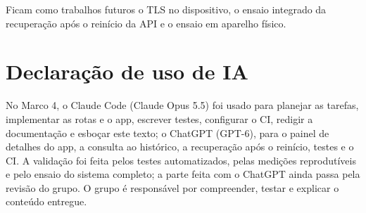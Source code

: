 \documentclass[12pt,a4paper]{article}
\begin{document}
Ficam como trabalhos futuros o TLS no dispositivo, o ensaio integrado da recuperação após o reinício da API e o ensaio em aparelho físico.

\section*{Declaração de uso de IA}
No Marco 4, o Claude Code (Claude Opus 5.5) foi usado para planejar as tarefas, implementar as rotas e o app, escrever testes, configurar o CI, redigir a documentação e esboçar este texto; o ChatGPT (GPT-6), para o painel de detalhes do app, a consulta ao histórico, a recuperação após o reinício, testes e o CI.
A validação foi feita pelos testes automatizados, pelas medições reprodutíveis e pelo ensaio do sistema completo; a parte feita com o ChatGPT ainda passa pela revisão do grupo.
O grupo é responsável por compreender, testar e explicar o conteúdo entregue.
\end{document}
